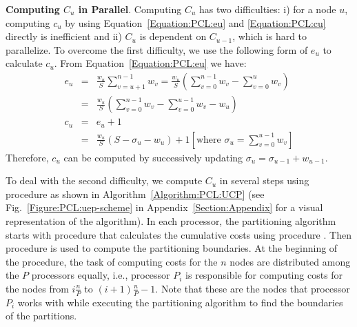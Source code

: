 \documentclass[conference,letterpaper,10pt]{IEEEtran}
\newcommand{\Figure}{Fig.\xspace}
\begin{document}
\textbf{Computing $C_u$ in Parallel}. Computing $C_u$ has two difficulties: i) for a node $u$, computing $c_{u}$ by using Equation~\ref{Equation:PCL:eu} and \ref{Equation:PCL:cu} directly is inefficient and ii) $C_{u}$ is dependent on $C_{u-1}$, which is hard to parallelize. To overcome the first difficulty, we use the following form of $e_u$ to calculate $c_u$. From Equation~\ref{Equation:PCL:eu} we have:
\begin{eqnarray}
e_{u} &=& \frac{w_u}{S}\sum_{v=u+1}^{n-1}w_{v}
		=\frac{w_u}{S} \left( \sum_{v=0}^{n-1}w_v-\sum_{v=0}^{u}w_v \right)\nonumber\\
		&=& \frac{w_u}{S} \left( \sum_{v=0}^{n-1}w_v-\sum_{v=0}^{u-1}w_v - w_u \right) \nonumber\\
c_u	&=& \textstyle e_{u}+1 \nonumber\\
&=&\frac{w_u}{S} \left( S - \sigma_{u} - w_u\right) +1 \left[\text{where }\sigma_{u}=\sum_{v=0}^{u-1}w_{v}\right]
\label{Equation:PCL:expected-edges}
\end{eqnarray}
Therefore, $c_{u}$ can be computed by successively updating $\sigma_{u}=\sigma_{u-1}+w_{u-1}$.

To deal with the second difficulty, we compute $C_{u}$ in several steps using procedure  as shown in Algorithm~\ref{Algorithm:PCL:UCP} (see \Figure~\ref{Figure:PCL:uep-scheme} in Appendix~\ref{Section:Appendix} for a visual representation of the algorithm). In each processor, the partitioning algorithm starts with procedure  that calculates the cumulative costs using procedure  . Then procedure  is used to compute the partitioning boundaries.
At the beginning of the  procedure, the task of computing costs for the $n$ nodes are distributed among the $P$ processors equally, i.e., processor $P_{i}$ is responsible for computing costs for the nodes  from $i\frac{n}{P}$ to $(i+1)\frac{n}{P}-1$. Note that these are the nodes that processor $P_{i}$ works with while executing the partitioning algorithm to find the boundaries of the partitions. 
\end{document}
